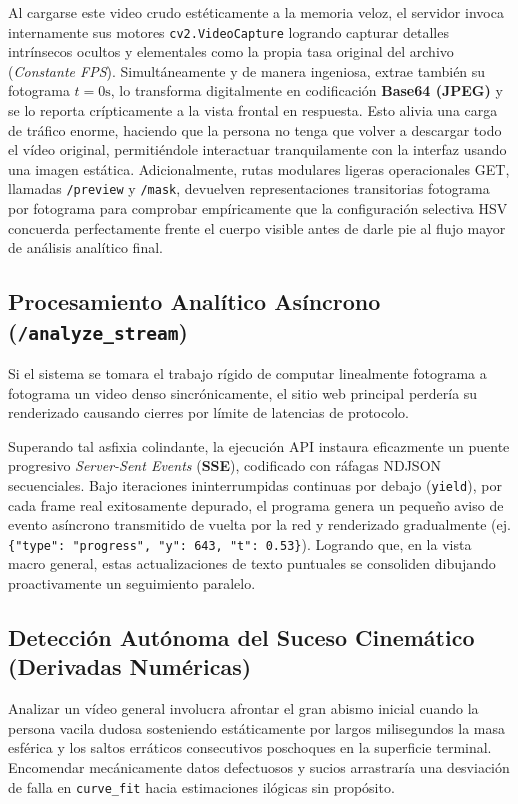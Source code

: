 \documentclass[12pt,a4paper]{article}
\begin{document}
Al cargarse este video crudo estéticamente a la memoria veloz, el servidor invoca internamente sus motores \texttt{cv2.VideoCapture} logrando capturar detalles intrínsecos ocultos y elementales como la propia tasa original del archivo (\textit{Constante FPS}). Simultáneamente y de manera ingeniosa, extrae también su fotograma $t=0\text{s}$, lo transforma digitalmente en codificación \textbf{Base64 (JPEG)} y se lo reporta crípticamente a la vista frontal en respuesta. Esto alivia una carga de tráfico enorme, haciendo que la persona no tenga que volver a descargar todo el vídeo original, permitiéndole interactuar tranquilamente con la interfaz usando una imagen estática. Adicionalmente, rutas modulares ligeras operacionales GET, llamadas \texttt{/preview} y \texttt{/mask}, devuelven representaciones transitorias fotograma por fotograma para comprobar empíricamente que la configuración selectiva HSV concuerda perfectamente frente el cuerpo visible antes de darle pie al flujo mayor de análisis analítico final.

\subsection{Procesamiento Analítico Asíncrono (\texttt{/analyze\_stream})}
Si el sistema se tomara el trabajo rígido de computar linealmente fotograma a fotograma un video denso sincrónicamente, el sitio web principal perdería su renderizado causando cierres por límite de latencias de protocolo.

Superando tal asfixia colindante, la ejecución API instaura eficazmente un puente progresivo \textit{Server-Sent Events} (\textbf{SSE}), codificado con ráfagas NDJSON secuenciales. Bajo iteraciones ininterrumpidas continuas por debajo (\texttt{yield}), por cada frame real exitosamente depurado, el programa genera un pequeño aviso de evento asíncrono transmitido de vuelta por la red y renderizado gradualmente (ej. \texttt{\{"type": "progress", "y": 643, "t": 0.53\}}). Logrando que, en la vista macro general, estas actualizaciones de texto puntuales se consoliden dibujando proactivamente un seguimiento paralelo.

\subsection{Detección Autónoma del Suceso Cinemático (Derivadas Numéricas)}
Analizar un vídeo general involucra afrontar el gran abismo inicial cuando la persona vacila dudosa sosteniendo estáticamente por largos milisegundos la masa esférica y los saltos erráticos consecutivos poschoques en la superficie terminal. Encomendar mecánicamente datos defectuosos y sucios arrastraría una desviación de falla en \texttt{curve\_fit} hacia estimaciones ilógicas sin propósito.
\end{document}

